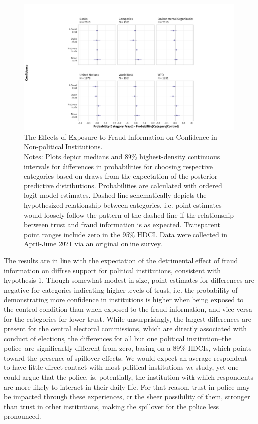 \documentclass[11pt, ngerman,english,a4]{article}
\begin{document}
\begin{figure}[H]
	\centering
	\includegraphics[width=0.8\linewidth,trim=4 4 4 4,clip]{figs/diffs_ol_main_npol.png}
	\caption{The Effects of Exposure to Fraud Information on Confidence in Non-political Institutions.  \\
		\footnotesize{Notes: Plots depict medians and 89\% highest-density continuous intervals for differences in probabilities for choosing respective categories based on draws from the expectation of the posterior predictive distributions. Probabilities are calculated with ordered logit model estimates.
			Dashed line schematically depicts the hypothesized relationship between categories, i.e. point estimates would loosely follow the pattern of the dashed line if the relationship between trust and fraud information is as expected. Transparent point ranges include zero in the 95\% HDCI.
	Data were collected in April-June 2021 via an original online survey.}}
	\singlespacing
	\raggedright
	\label{fig:main-npol}
\end{figure}

The results are in line with the expectation of the detrimental effect of fraud information on diffuse support for political institutions, consistent with hypothesis 1. 
Though somewhat modest in size, point estimates for differences are negative for categories indicating higher levels of trust, i.e. the probability of demonstrating more confidence in institutions is higher when being exposed to the control condition than when exposed to the fraud information, and vice versa for the categories for lower trust. 
While unsurprisingly, the largest differences are present for the central electoral commissions, which are directly associated with conduct of elections, the differences for all but one political institution--the police--are significantly different from zero, basing on a 89\% HDCIs, which points toward the presence of spillover effects. 
We would expect an average respondent to have little direct contact with most political institutions we study, yet one could argue that the police, is, potentially, the institution with which respondents are more likely to interact in their daily life. 
For that reason, trust in police may be impacted through these experiences, or the sheer possibility of them, stronger than trust in other institutions, making the spillover for the police less pronounced. 
\end{document}
